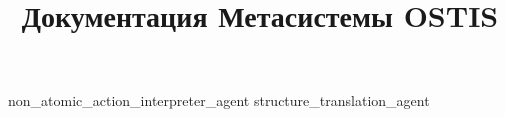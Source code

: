 \documentclass{scndocument}
\begin{document}

\DeactivateBG
\title{\centering
Документация Метасистемы OSTIS}
\maketitle

\normalsize

\setcounter{page}{3}

\ActivateBG
\begin{SCn}






{non_atomic_action_interpreter_agent}
{structure_translation_agent}

\end{SCn}
\end{document}
